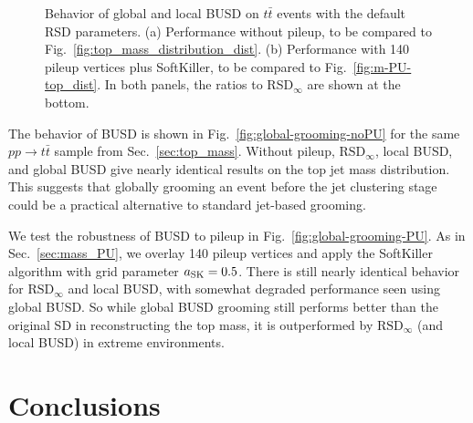 \documentclass[11pt,a4paper]{article}
\newcommand{\RSDinf}{\text{RSD}_\infty}
\DeclareRobustCommand{\Sec}[1]{Sec.~\ref{#1}}
\DeclareRobustCommand{\Fig}[1]{Fig.~\ref{#1}}
\begin{document}
\begin{figure}
  \centering
  \qquad
  \caption{  Behavior of global and local BUSD on $t\bar{t}$ events
    with the default RSD parameters.  (a)  Performance without pileup,
    to be compared to \Fig{fig:top_mass_distribution_dist}.  (b)
    Performance with 140 pileup vertices plus SoftKiller, to be compared to
    \Fig{fig:m-PU-top_dist}.  In both panels, the ratios to
    RSD$_{\infty}$ are shown at the bottom.}
  \label{fig:global-grooming}
\end{figure}

The behavior of BUSD is shown in \Fig{fig:global-grooming-noPU} for the same $pp \to t \bar{t}$ sample from \Sec{sec:top_mass}.
%
Without pileup, $\RSDinf$, local BUSD, and global BUSD give nearly identical results on the top jet mass distribution.
%
This suggests that globally grooming an event before the jet clustering stage could be a practical alternative to standard jet-based grooming.


We test the robustness of BUSD to pileup in \Fig{fig:global-grooming-PU}.
%
As in \Sec{sec:mass_PU}, we overlay 140 pileup vertices and apply the SoftKiller algorithm with grid parameter $a_{\rm SK}=0.5$.
%
There is still nearly identical behavior for $\RSDinf$ and local BUSD, with somewhat degraded performance seen using global BUSD.
%
So while global BUSD grooming still performs better than the original SD in reconstructing the top mass, it is outperformed by $\RSDinf$ (and local BUSD) in
extreme environments.

\section{Conclusions}
\label{sec:conclusions}
\end{document}
